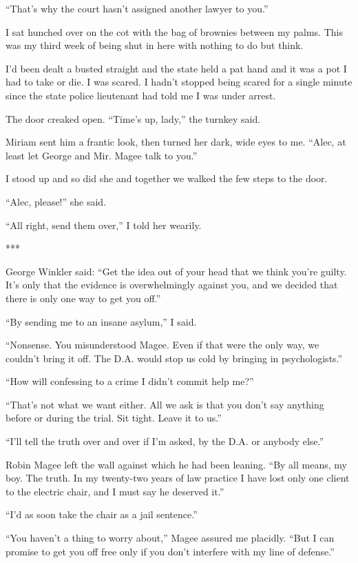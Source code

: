 \documentclass{novel}
\begin{document}
{“That’s why the court hasn’t assigned another lawyer to you.”

I sat hunched over on the cot with the bag of brownies between my palms. This was my third week of being shut in here with nothing to do but think.

I’d been dealt a busted straight and the state held a pat hand and it was a pot I had to take or die. I was scared. I hadn’t stopped being scared for a single minute since the state police lieutenant had told me I was under arrest.

The door creaked open. “Time’s up, lady,” the turnkey said.

Miriam sent him a frantic look, then turned her dark, wide eyes to me. “Alec, at least let George and Mir. Magee talk to you.”

I stood up and so did she and together we walked the few steps to the door.

“Alec, please!” she said.

“All right, send them over,” I told her wearily.

***

George Winkler said: “Get the idea out of your head that we think you’re guilty. It’s only that the evidence is overwhelmingly against you, and we decided that there is only one way to get you off.”

“By sending me to an insane asylum,” I said.

“Nonsense. You misunderstood Magee. Even if that were the only way, we couldn’t bring it off. The D.A. would stop us cold by bringing in psychologists.”

“How will confessing to a crime I didn’t commit help me?”

“That’s not what we want either. All we ask is that you don’t say anything before or during the trial. Sit tight. Leave it to us.”

“I’ll tell the truth over and over if I’m asked, by the D.A. or anybody else.”

Robin Magee left the wall against which he had been leaning. “By all means, my boy. The truth. In my twenty-two years of law practice I have lost only one client to the electric chair, and I must say he deserved it.”

“I’d as soon take the chair as a jail sentence.”

“You haven’t a thing to worry about,” Magee assured me placidly. “But I can promise to get you off free only if you don’t interfere with my line of defense.”

}
\end{document}
